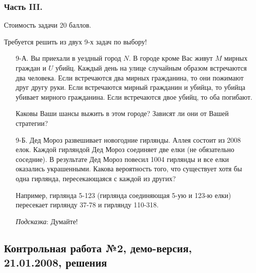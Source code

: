 \subsubsection*{Часть III.}

Стоимость задачи 20 баллов.

Требуется решить \textbf{} из двух 9-х задач по
выбору!

\begin{enumerate}
\item[9-А.] Вы приехали в уездный город $N$. В городе кроме Вас живут $M$ мирных граждан и $U$ убийц. Каждый день на улице случайным образом встречаются два человека. Если встречаются два мирных гражданина, то они пожимают друг другу руки. Если встречаются мирный гражданин и убийца, то убийца убивает мирного гражданина. Если встречаются двое убийц, то оба погибают.

Каковы Ваши шансы выжить в этом городе? Зависят ли они от Вашей стратегии?

\item[9-Б.] Дед Мороз развешивает новогодние гирлянды. Аллея состоит из 2008 елок. Каждой гирляндой Дед Мороз соединяет две елки (не обязательно соседние). В результате Дед Мороз повесил 1004 гирлянды и все елки оказались украшенными. Какова вероятность того, что существует хотя бы одна гирлянда, пересекающаяся с каждой из других?

Например, гирлянда 5-123 (гирлянда соединяющая 5-ую и 123-ю елки) пересекает гирлянду 37-78 и гирлянду 110-318.

\emph{Подсказка}: Думайте!
\end{enumerate}


\subsection{Контрольная работа №2, демо-версия, 21.01.2008, решения}

